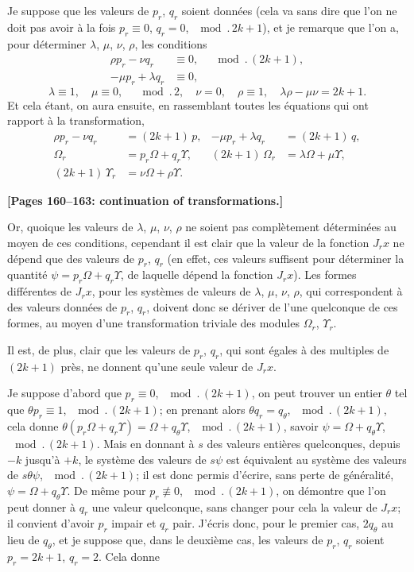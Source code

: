 \documentclass[11pt,a4paper]{article}
\theoremstyle{definition}
\begin{document}
Je suppose que les valeurs de $p_r$, $q_r$ soient donn\'ees (cela va sans
dire que l'on ne doit pas avoir \`a la fois $p_r \equiv 0$, $q_r = 0$,
$\mod.\,2k+1$), et je remarque que l'on a, pour d\'eterminer $\lambda$,
$\mu$, $\nu$, $\rho$, les conditions
\begin{align*}
\rho p_r - \nu q_r &\equiv 0, \quad \mod.\,(2k+1), \\
-\mu p_r + \lambda q_r &\equiv 0,
\end{align*}
\[
\lambda \equiv 1,\quad \mu \equiv 0, \quad \mod.\,2,\quad
\nu = 0,\quad \rho \equiv 1,\quad
\lambda\rho - \mu\nu = 2k+1.
\]
Et cela \'etant, on aura ensuite, en rassemblant toutes les \'equations qui
ont rapport \`a la transformation,
\begin{align*}
\rho p_r - \nu q_r &= (2k+1)\,p, &
-\mu p_r + \lambda q_r &= (2k+1)\,q, \\
\Omega_r &= p_r\Omega + q_r\Upsilon, &
(2k+1)\,\Omega_r &= \lambda\Omega + \mu\Upsilon, \\
(2k+1)\,\Upsilon_r &= \nu\Omega + \rho\Upsilon. &
\end{align*}

\medskip
\noindent\textbf{[Pages 160--163: continuation of transformations.]}

Or, quoique les valeurs de $\lambda$, $\mu$, $\nu$, $\rho$ ne soient pas
compl\`etement d\'etermin\'ees au moyen de ces conditions, cependant il est
clair que la valeur de la fonction $J_r x$ ne d\'epend que des valeurs de
$p_r$, $q_r$ (en effet, ces valeurs suffisent pour d\'eterminer la quantit\'e
$\psi = p_r\Omega + q_r\Upsilon$, de laquelle d\'epend la fonction $J_r x$).
Les formes diff\'erentes de $J_r x$, pour les syst\`emes de valeurs de
$\lambda$, $\mu$, $\nu$, $\rho$, qui correspondent \`a des valeurs donn\'ees de
$p_r$, $q_r$, doivent donc se d\'eriver de l'une quelconque de ces formes,
au moyen d'une transformation triviale des modules $\Omega_r$, $\Upsilon_r$.

Il est, de plus, clair que les valeurs de $p_r$, $q_r$, qui sont \'egales
\`a des multiples de $(2k+1)$ pr\`es, ne donnent qu'une seule valeur de
$J_r x$.

Je suppose d'abord que $p_r \equiv 0$, $\mod.\,(2k+1)$, on peut trouver un
entier $\theta$ tel que $\theta p_r \equiv 1$, $\mod.\,(2k+1)$; en prenant alors
$\theta q_r = q_\theta$, $\mod.\,(2k+1)$, cela donne
$\theta(p_r\Omega + q_r\Upsilon) = \Omega + q_\theta\Upsilon$,
$\mod.\,(2k+1)$, savoir $\psi = \Omega + q_\theta\Upsilon$,
$\mod.\,(2k+1)$. Mais en donnant \`a $s$ des valeurs enti\`eres quelconques,
depuis $-k$ jusqu'\`a $+k$, le syst\`eme des valeurs de $s\psi$ est
\'equivalent au syst\`eme des valeurs de $s\theta\psi$, $\mod.\,(2k+1)$; il
est donc permis d'\'ecrire, sans perte de g\'en\'eralit\'e,
$\psi = \Omega + q_\theta\Upsilon$. De m\^eme pour $p_r \not\equiv 0$,
$\mod.\,(2k+1)$, on d\'emontre que l'on peut donner \`a $q_r$ une valeur
quelconque, sans changer pour cela la valeur de $J_r x$; il convient d'avoir
$p_r$ impair et $q_r$ pair. J'\'ecris donc, pour le premier cas, $2q_\theta$
au lieu de $q_\theta$, et je suppose que, dans le deuxi\`eme cas, les valeurs
de $p_r$, $q_r$ soient $p_r = 2k+1$, $q_r = 2$. Cela donne
\end{document}
